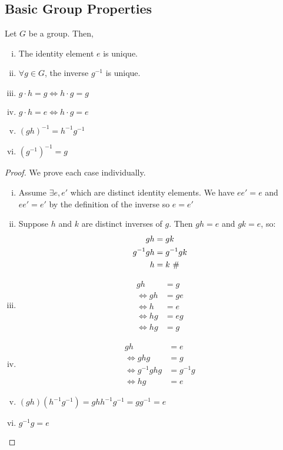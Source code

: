 \documentclass{article}
\begin{document}
\subsection{Basic Group Properties}
\begin{proposition}
    Let $G$ be a group. Then,
    \begin{enumerate}[i.]
        \item The identity element $e$ is unique.
        \item $\forall g \in G$, the inverse $g^{-1}$ is unique.
        \item $g \cdot h = g \iff h \cdot g = g$
        \item $g \cdot h = e \iff h \cdot g = e$
        \item $(gh)^{-1} = h^{-1} g^{-1}$
        \item $(g^{-1})^{-1} = g$
    \end{enumerate}
\end{proposition}
\begin{proof}
    We prove each case individually.
    \begin{enumerate}[i.]
        \item Assume $\exists e, e'$ which are distinct identity elements. We have $e e' = e$ and $e e' = e'$ by the definition of the inverse so $e = e'$ \contradiction
        \item Suppose $h$ and $k$ are distinct inverses of $g$. Then $gh = e$ and $gk = e$, so:
              \begin{align*}
                  gh        & = gk                       \\
                  g^{-1} gh & = g^{-1} gk                \\
                  h         & = k \text{ $\#$}
              \end{align*}
        \item \begin{align*}
                  gh      & = g  \\
                  \iff gh & = ge \\
                  \iff h  & = e  \\
                  \iff hg & = eg \\
                  \iff hg & = g
              \end{align*}
        \item \begin{align*}
                  gh              & = e       \\
                  \iff ghg        & = g       \\
                  \iff g^{-1} ghg & = g^{-1}g \\
                  \iff hg         & = e
              \end{align*}
        \item $(gh) (h^{-1}g^{-1}) = g h h^{-1} g^{-1} = g g^{-1} = e$
        \item $g^{-1} g = e$
    \end{enumerate}
\end{proof}
\end{document}
